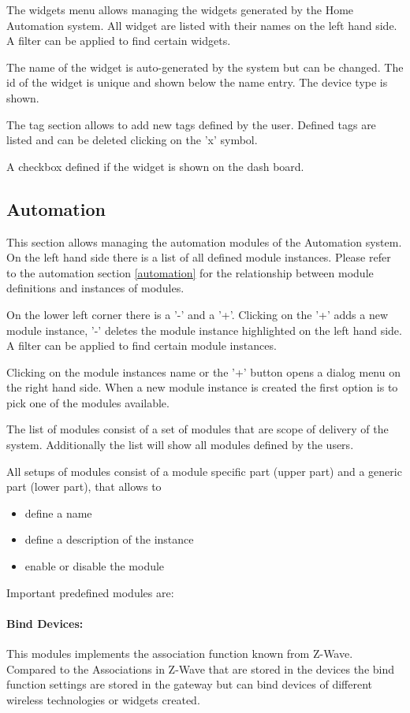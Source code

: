 The widgets menu allows managing the widgets generated by the 
Home Automation system. All widget are listed with their names on the left hand side.
A filter can be applied to find certain widgets.

The name of the widget is auto-generated by the system but can be changed. The id of the 
widget is unique and shown below the name entry.
The device type is shown.

The tag section allows to add new tags defined by the user. 
Defined tags are listed and can be deleted clicking on the 'x' symbol.

A checkbox defined if the widget is shown on the dash board.


\subsection{Automation}

This section allows managing the automation modules of the Automation system.
On the left hand side there is a list of all defined module instances. Please refer 
to the automation section \ref{automation} for the relationship between module 
definitions and instances of modules.

On the lower left corner there is a '-' and 
a '+'. Clicking on the '+' adds a new module instance, '-' deletes the module instance 
highlighted on the left  hand side. A filter can be applied to find certain module
instances.

Clicking on the module instances name or the '+' button opens a dialog menu on the 
right hand side. When a new module instance is created the first option is to pick
one of the modules available.

The list of modules consist of a set of modules that are scope of delivery of the system.
Additionally the list will show all modules defined by the users.

All setups of modules consist of a module specific part (upper part) and a generic 
part (lower part), that allows to 

\begin{itemize}
\item  define a name
\item  define a description of the instance
\item  enable or disable the module
\end{itemize}

Important predefined modules are:

\paragraph{Bind Devices: } This modules implements the association function 
known from Z-Wave. Compared to the Associations in Z-Wave that are stored
in the devices the bind function settings are stored in the gateway but can
bind devices of different wireless technologies or widgets created.

